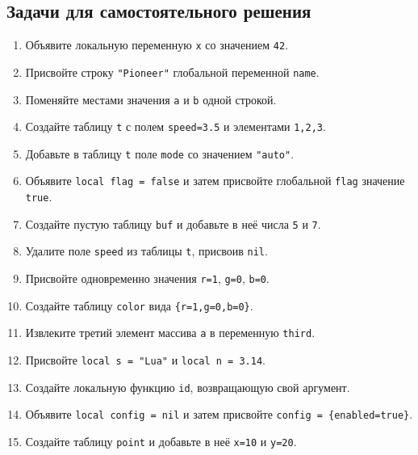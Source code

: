 \subsection*{Задачи для самостоятельного решения}
\begin{enumerate}
  \item Объявите локальную переменную \verb|x| со значением \verb|42|.
  \item Присвойте строку \verb|"Pioneer"| глобальной переменной \verb|name|.
  \item Поменяйте местами значения \verb|a| и \verb|b| одной строкой.
  \item Создайте таблицу \verb|t| с полем \verb|speed=3.5| и элементами \verb|1,2,3|.
  \item Добавьте в таблицу \verb|t| поле \verb|mode| со значением \verb|"auto"|.
  \item Объявите \verb|local flag = false| и затем присвойте глобальной \verb|flag| значение \verb|true|.
  \item Создайте пустую таблицу \verb|buf| и добавьте в неё числа \verb|5| и \verb|7|.
  \item Удалите поле \verb|speed| из таблицы \verb|t|, присвоив \verb|nil|.
  \item Присвойте одновременно значения \verb|r=1|, \verb|g=0|, \verb|b=0|.
  \item Создайте таблицу \verb|color| вида \verb|{r=1,g=0,b=0}|.
  \item Извлеките третий элемент массива \verb|a| в переменную \verb|third|.
  \item Присвойте \verb|local s = "Lua"| и \verb|local n = 3.14|.
  \item Создайте локальную функцию \verb|id|, возвращающую свой аргумент.
  \item Объявите \verb|local config = nil| и затем присвойте \verb|config = {enabled=true}|.
  \item Создайте таблицу \verb|point| и добавьте в неё \verb|x=10| и \verb|y=20|.
\end{enumerate}
